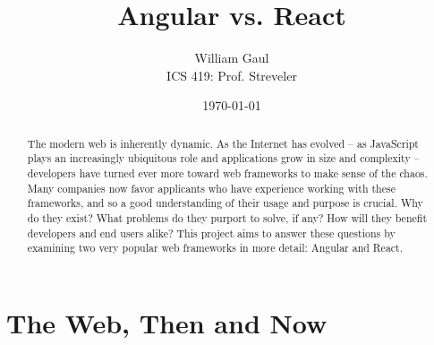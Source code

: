\documentclass[12pt,letterpaper]{article}
\title{\textbf{Angular vs. React}}
\author{William Gaul\\{ICS 419: Prof. Streveler}}
\date{\today}
\begin{document}
\maketitle

\renewcommand{\abstractname}{Executive Summary}
\begin{singlespace*}
\begin{abstract}
	The modern web is inherently dynamic. As the Internet has evolved -- as JavaScript plays an increasingly ubiquitous role and applications grow in size and complexity -- developers have turned ever more toward web frameworks to make sense of the chaos. Many companies now favor applicants who have experience working with these frameworks, and so a good understanding of their usage and purpose is crucial. Why do they exist? What problems do they purport to solve, if any? How will they benefit developers and end users alike? This project aims to answer these questions by examining two very popular web frameworks in more detail: Angular and React.
\end{abstract}
\end{singlespace*}

\section{The Web, Then and Now}

\cite{Schlensker:2014}
\cite{Angular:Docs}
\cite{Hunt:2013}



\end{document}
